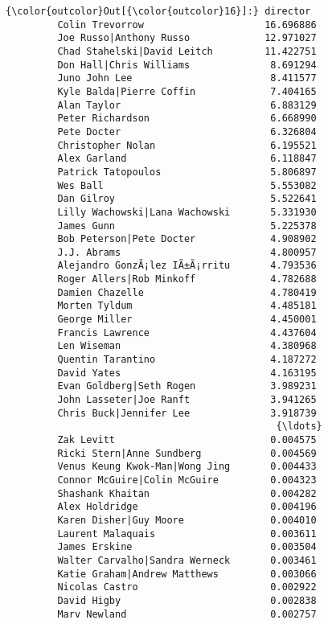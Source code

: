 \documentclass[11pt]{article}
\begin{document}
\begin{Verbatim}[commandchars=\\\{\}]
{\color{outcolor}Out[{\color{outcolor}16}]:} director
         Colin Trevorrow                     16.696886
         Joe Russo|Anthony Russo             12.971027
         Chad Stahelski|David Leitch         11.422751
         Don Hall|Chris Williams              8.691294
         Juno John Lee                        8.411577
         Kyle Balda|Pierre Coffin             7.404165
         Alan Taylor                          6.883129
         Peter Richardson                     6.668990
         Pete Docter                          6.326804
         Christopher Nolan                    6.195521
         Alex Garland                         6.118847
         Patrick Tatopoulos                   5.806897
         Wes Ball                             5.553082
         Dan Gilroy                           5.522641
         Lilly Wachowski|Lana Wachowski       5.331930
         James Gunn                           5.225378
         Bob Peterson|Pete Docter             4.908902
         J.J. Abrams                          4.800957
         Alejandro GonzÃ¡lez IÃ±Ã¡rritu       4.793536
         Roger Allers|Rob Minkoff             4.782688
         Damien Chazelle                      4.780419
         Morten Tyldum                        4.485181
         George Miller                        4.450001
         Francis Lawrence                     4.437604
         Len Wiseman                          4.380968
         Quentin Tarantino                    4.187272
         David Yates                          4.163195
         Evan Goldberg|Seth Rogen             3.989231
         John Lasseter|Joe Ranft              3.941265
         Chris Buck|Jennifer Lee              3.918739
                                               {\ldots}    
         Zak Levitt                           0.004575
         Ricki Stern|Anne Sundberg            0.004569
         Venus Keung Kwok-Man|Wong Jing       0.004433
         Connor McGuire|Colin McGuire         0.004323
         Shashank Khaitan                     0.004282
         Alex Holdridge                       0.004196
         Karen Disher|Guy Moore               0.004010
         Laurent Malaquais                    0.003611
         James Erskine                        0.003504
         Walter Carvalho|Sandra Werneck       0.003461
         Katie Graham|Andrew Matthews         0.003066
         Nicolas Castro                       0.002922
         David Higby                          0.002838
         Marv Newland                         0.002757

\end{Verbatim}
\end{document}
